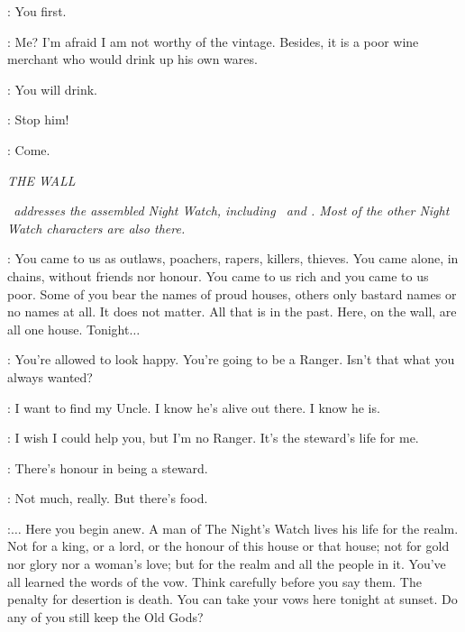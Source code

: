\JORAH: You first. 

\WINESELLER: Me? I'm afraid I am not worthy of the vintage. Besides, it is a poor wine merchant who would drink up his own wares. 

\DAENERYS: You will drink. 


\JORAH: Stop him! 


\JORAH: Come. 


\scene

\textit{THE WALL} 

\textit{\JEOR ~addresses the assembled Night Watch, including \JON ~and \SAM. Most of the other Night Watch characters are also there.} 

\JEOR: You came to us as outlaws, poachers, rapers, killers,
thieves. You came alone, in chains, without friends nor honour. You
came to us rich and you came to us poor. Some of you bear the names of
proud houses, others only bastard names or no names at all. It does
not matter. All that is in the past. Here, on the wall, are all one
house. Tonight$\ldots$


\SAM: You're allowed to look happy. You're going to be a Ranger. Isn't that what you always wanted? 

\JON: I want to find my Uncle. I know he's alive out there. I know he is. 

\SAM: I wish I could help you, but I'm no Ranger. It's the steward's life for me. 

\JON: There's honour in being a steward. 

\SAM: Not much, really. But there's food. 

\JEOR:$\ldots$ Here you begin anew. A man of The Night's Watch lives his life for the realm. Not for a king, or a lord, or the honour of this house or that house; not for gold nor glory nor a woman's love; but for the realm and all the people in it. You've all learned the words of the vow. Think carefully before you say them. The penalty for desertion is death. You can take your vows here tonight at sunset. Do any of you still keep the  Old Gods? 

